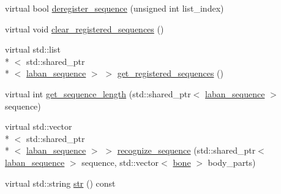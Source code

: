 \begin{DoxyCompactItemize}
virtual bool \hyperlink{classmae_1_1fl_1_1laban_1_1laban__sequence__recognizer_ac3fb568e668228472ea3a1ff0124898e}{deregister\-\_\-sequence} (unsigned int list\-\_\-index)
\item 
virtual void \hyperlink{classmae_1_1fl_1_1laban_1_1laban__sequence__recognizer_a4eaa30d1cd8064e381765a2b3385a248}{clear\-\_\-registered\-\_\-sequences} ()
\item 
virtual std\-::list\\*
$<$ std\-::shared\-\_\-ptr\\*
$<$ \hyperlink{classmae_1_1fl_1_1laban_1_1laban__sequence}{laban\-\_\-sequence} $>$ $>$ \hyperlink{classmae_1_1fl_1_1laban_1_1laban__sequence__recognizer_ae7d217b9a173ae7c8c755856d73113f3}{get\-\_\-registered\-\_\-sequences} ()
\item 
virtual int \hyperlink{classmae_1_1fl_1_1laban_1_1laban__sequence__recognizer_a4cb477435572ac7f3c30f8ddc22587a8}{get\-\_\-sequence\-\_\-length} (std\-::shared\-\_\-ptr$<$ \hyperlink{classmae_1_1fl_1_1laban_1_1laban__sequence}{laban\-\_\-sequence} $>$ sequence)
\item 
virtual std\-::vector\\*
$<$ std\-::shared\-\_\-ptr\\*
$<$ \hyperlink{classmae_1_1fl_1_1laban_1_1laban__sequence}{laban\-\_\-sequence} $>$ $>$ \hyperlink{classmae_1_1fl_1_1laban_1_1laban__sequence__recognizer_afd0fe4b625602a5b169095a3e367349d}{recognize\-\_\-sequence} (std\-::shared\-\_\-ptr$<$ \hyperlink{classmae_1_1fl_1_1laban_1_1laban__sequence}{laban\-\_\-sequence} $>$ sequence, std\-::vector$<$ \hyperlink{classmae_1_1bone}{bone} $>$ body\-\_\-parts)
\item 
virtual std\-::string \hyperlink{classmae_1_1fl_1_1laban_1_1laban__sequence__recognizer_af411c388147b6945827ab7fdd47ce131}{str} () const 
\end{DoxyCompactItemize}


